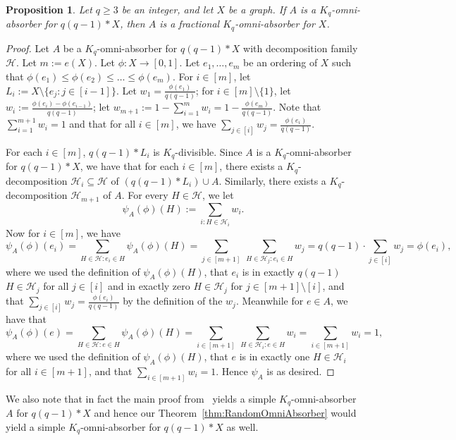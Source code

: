 \documentclass[11pt]{article}
\numberwithin{equation}{section}
\newcommand{\mc}[1]{\mathcal{#1}}
\newcounter{i}
\theoremstyle{plain}
\newtheorem{proposition}[thm]{Proposition}
\theoremstyle{plain} %
\theoremstyle{definition}
\newcommand{\cH}{\mathcal{H}}
\begin{document}
\begin{proposition}
Let $q\ge 3$ be an integer, and let $X$ be a graph. If $A$ is a $K_q$-omni-absorber for $q(q-1)*X$, then $A$ is a fractional $K_q$-omni-absorber for $X$.
\end{proposition}
\begin{proof}
Let $A$ be a $K_q$-omni-absorber for $q(q - 1)*X$ with decomposition family $\cH$.
Let $m:= e(X)$. Let $\phi:X\rightarrow [0,1]$. Let $e_1,\ldots, e_m$ be an ordering of $X$ such that $\phi(e_1)\le \phi(e_2) \le \ldots \le \phi(e_m)$. For $i\in [m]$, let $L_i:= X\setminus \{e_j:j\in [i-1]\}$. Let $w_1=\frac{\phi(e_1)}{q(q-1)}$; for $i\in [m]\setminus \{1\}$, let $w_i := \frac{\phi(e_i)-\phi(e_{i-1})}{q(q-1)}$; let $w_{m+1} := 1-\sum_{i=1}^m w_i = 1 -\frac{\phi(e_m)}{q(q-1)}$.  Note that $\sum_{i=1}^{m+1}w_i = 1$ and that for all $i\in [m]$, we have $\sum_{j\in [i]} w_j = \frac{\phi(e_i)}{q(q-1)}$.

For each $i\in [m]$, $q(q-1)*L_i$ is $K_q$-divisible. Since $A$ is a $K_q$-omni-absorber for $q(q-1)*X$, we have that for each $i\in [m]$, there exists a $K_q$-decomposition $\cH_i \subseteq \mc{H}$ of $(q(q-1)*L_i) \cup A$. Similarly, there exists a $K_q$-decomposition $\cH_{m+1}$ of $A$. For every $H \in \cH$, we let
\begin{equation*}
    \psi_{A}(\phi)(H) := \sum_{i : H \in \cH_i} w_i.
\end{equation*}
Now for $i\in [m]$, we have 
$$\psi_{A}(\phi)(e_i) = \sum_{H\in \mc{H}: e_i\in H} \psi_{A}(\phi)(H) = \sum_{j\in [m+1]}~\sum_{H\in \mc{H}_j: e_i\in H} w_j = q(q-1)\cdot \sum_{j\in [i]} w_j = \phi(e_i),$$ 
where we used the definition of $\psi_A(\phi)(H)$, that $e_i$ is in exactly $q(q-1)$ $H\in \mc{H}_j$ for all $j\in [i]$ and in exactly zero $H\in \mc{H}_j$ for $j\in [m+1]\setminus [i]$, and that $\sum_{j\in [i]} w_j = \frac{\phi(e_i)}{q(q-1)}$ by the definition of the $w_j$. Meanwhile for $e\in A$, we have that 
$$\psi_{A}(\phi)(e) = \sum_{H\in \mc{H}: e\in H} \psi_{A}(\phi)(H) = \sum_{i\in [m+1]}~\sum_{H\in \mc{H}_i: e\in H} w_i = \sum_{i\in [m+1]} w_i = 1,$$
where we used the definition of $\psi_A(\phi)(H)$, that $e$ is in exactly one $H\in \mc{H}_i$ for all $i\in [m+1]$, and that $\sum_{i\in [m+1]} w_i=1$.
Hence $\psi_A$ is as desired.
\end{proof}

We also note that in fact the main proof from~\cite{DPI} yields a simple $K_q$-omni-absorber $A$ for $q(q-1)*X$ and hence our Theorem~\ref{thm:RandomOmniAbsorber} would yield a simple $K_q$-omni-absorber for $q(q-1)*X$ as well. 
\end{document}
